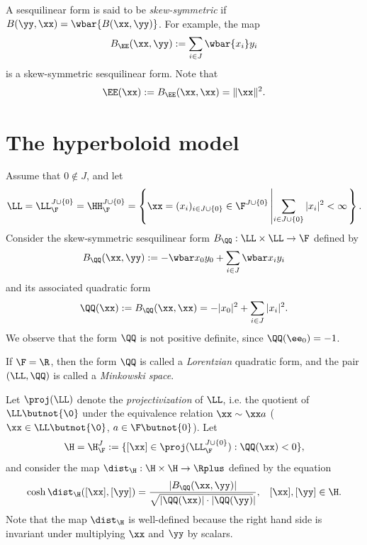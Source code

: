 A sesquilinear form is said to be \emph{skew-symmetric} if $B(\yy,\xx) = \wbar{B(\xx,\yy)}$. For example, the map
\[
B_\EE(\xx,\yy) := \sum_{i\in J} \wbar{x_i} y_i
\]
is a skew-symmetric sesquilinear form. Note that
\[
\EE(\xx) := B_\EE(\xx,\xx) = \|\xx\|^2.
\]

\section{The hyperboloid model}
\label{subsectionhyperboloidmodel}
Assume that $0\notin J$, and let
\[
\LL = \LL_\F^{J\cup\{0\}} = \HH_\F^{J\cup\{0\}} = \left\{\xx = (x_i)_{i\in J\cup\{0\}}\in\F^{J\cup\{0\}} \left\vert\sum_{i\in J\cup\{0\}} |x_i|^2 < \infty\right.\right\}.
\]
Consider the skew-symmetric sesquilinear form $B_\QQ:\LL\times\LL\to\F$ defined by
\[
B_\QQ(\xx,\yy) := -\wbar x_0 y_0 + \sum_{i\in J} \wbar x_i y_i
\]
and its associated quadratic form
\begin{equation}
\label{Qdef}
\QQ(\xx) := B_\QQ(\xx,\xx) = -|x_0|^2 + \sum_{i\in J} |x_i|^2.
\end{equation}
We observe that the form $\QQ$ is not positive definite, since $\QQ(\ee_0) = -1$.

\begin{remark}
If $\F = \R$, then the form $\QQ$ is called a \emph{Lorentzian} quadratic form, and the pair $(\LL,\QQ)$ is called a \emph{Minkowski space}.
\end{remark}

Let $\proj(\LL)$ denote the \emph{projectivization} of $\LL$, i.e. the quotient of $\LL\butnot\{\0\}$ under the equivalence relation $\xx\sim \xx a$ ($\xx\in\LL\butnot\{\0\}$, $a\in \F\butnot\{0\}$). Let
\[
\H = \H_\F^J := \{ [\xx]\in\proj(\LL_\F^{J\cup\{0\}}) : \QQ(\xx) < 0 \},
\]
and consider the map $\dist_\H: \H\times\H\to \Rplus$ defined by the equation
\begin{equation}
\label{distanceinL}
\cosh\dist_\H([\xx],[\yy]) = \frac{|B_\QQ(\xx,\yy)|}{\sqrt{|\QQ(\xx)|\cdot|\QQ(\yy)}|}, \;\;\; [\xx],[\yy]\in \H.
\end{equation}
Note that the map $\dist_\H$ is well-defined because the right hand side is invariant under multiplying $\xx$ and $\yy$ by scalars.

